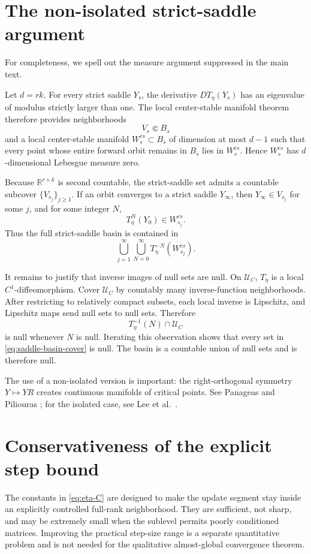 \documentclass[11pt]{article}
\newcommand{\RR}{\mathbb{R}}
\newcommand{\cU}{\mathcal{U}}
\begin{document}
\section{The non-isolated strict-saddle argument}
\label{app:saddles}

For completeness, we spell out the measure argument suppressed in the main
text.

Let \(d=rk\). For every strict saddle \(Y_s\), the derivative
\(DT_\eta(Y_s)\) has an eigenvalue of modulus strictly larger than one. The
local center-stable manifold theorem therefore provides neighborhoods
\[
V_s\Subset B_s
\]
and a local center-stable manifold \(W_s^{cs}\subset B_s\) of dimension at
most \(d-1\) such that every point whose entire forward orbit remains in
\(B_s\) lies in \(W_s^{cs}\). Hence \(W_s^{cs}\) has \(d\)-dimensional
Lebesgue measure zero.

Because \(\RR^{r\times k}\) is second countable, the strict-saddle set admits
a countable subcover \(\{V_{s_j}\}_{j\ge1}\). If an orbit converges to a strict
saddle \(Y_\infty\), then \(Y_\infty\in V_{s_j}\) for some \(j\), and for some
integer \(N\),
\[
T_\eta^N(Y_0)\in W_{s_j}^{cs}.
\]
Thus the full strict-saddle basin is contained in
\[
\bigcup_{j=1}^{\infty}
\bigcup_{N=0}^{\infty}
T_\eta^{-N}(W_{s_j}^{cs}).
\tag{23}
\label{eq:saddle-basin-cover}
\]

It remains to justify that inverse images of null sets are null. On \(\cU_C\),
\(T_\eta\) is a local \(C^1\)-diffeomorphism. Cover \(\cU_C\) by countably many
inverse-function neighborhoods. After restricting to relatively compact
subsets, each local inverse is Lipschitz, and Lipschitz maps send null sets to
null sets. Therefore
\[
T_\eta^{-1}(N)\cap\cU_C
\]
is null whenever \(N\) is null. Iterating this observation shows that every
set in \eqref{eq:saddle-basin-cover} is null. The basin is a countable union of
null sets and is therefore null.

The use of a non-isolated version is important: the right-orthogonal symmetry
\(Y\mapsto YR\) creates continuous manifolds of critical points. See
Panageas and Piliouras \cite{panageas2017nonisolated}; for the isolated case,
see Lee et al.\ \cite{lee2016gradient}.

\section{Conservativeness of the explicit step bound}

The constants in \eqref{eq:eta-C} are designed to make the update segment stay
inside an explicitly controlled full-rank neighborhood. They are sufficient,
not sharp, and may be extremely small when the sublevel permits poorly
conditioned matrices. Improving the practical step-size range is a separate
quantitative problem and is not needed for the qualitative almost-global
convergence theorem.
\end{document}

